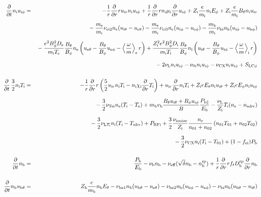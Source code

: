 \documentclass[11pt]{article}
\def\r#1{{\rm#1}}
\def\ddt{\frac{\partial}{\partial t}}
\def\ddr{\frac{\partial}{\partial r}}
\def\ave#1{\left\langle#1\right\rangle}
\def\me{m_\r{e}}
\def\mi{m_\r{i}}
\def\mb{m_\r{b}}
\def\mui{\mu_\r{i}}
\def\De{D_\r{e}}
\def\Di{D_\r{i}}
\def\chii{\chi_\r{i}}
\def\ne{n_\r{e}}
\def\ni{n_\r{i}}
\def\nb{n_\r{b}}
\def\uir{u_{\r{i}r}}
\def\ueth{u_{\r{e}\theta}}
\def\uith{u_{\r{i}\theta}}
\def\ubth{u_{\r{b}\theta}}
\def\ueph{u_{\r{e}\phi}}
\def\uiph{u_{\r{i}\phi}}
\def\ubph{u_{\r{b}\phi}}
\def\Eth{E_\theta}
\def\Eph{E_\phi}
\def\Bth{B_\theta}
\def\Bph{B_\phi}
\def\Te{T_\r{e}}
\def\Ti{T_\r{i}}
\def\nna{n_{01}}
\def\nnb{n_{02}}
\def\Zi{Z_\r{i}}
\def\Zb{Z_\r{b}}
\def\Pb{P_\r{b}}
\def\Eb{E_\r{b}}
\def\PRFi{P_\r{RFi}}
\def\Tna{T_{01}}
\def\Tnb{T_{02}}
\def\fei{f_\r{ei}}
\def\nbrp{n_\r{b}^\r{rp}}
\def\Pbpara{P_{\r{b}\parallel}}
\def\nueff{\nu_\r{eff}}
\def\Dbrp{D_\r{b}^\r{rp}}
\def\nuNCi{\nu_\r{NCi}}
\def\nubi{\nu_\r{bi}}
\def\nuni{\nu_\r{0i}}
\def\nuL{\nu_\r{L}}
\def\nuCX{\nu_\r{CX}}
\def\nuion{\nu_\r{ionize}}
\def\nub{\nu_\r{b}}
\def\nuTei{\nu_\r{Tei}}
\def\vb{v_\r{b}}
\def\nediv{n_\r{ediv}}
\def\Tidiv{T_\r{idiv}}
\def\nuLTi{\nu_{\r{L}T_\r{i}}}
\begin{document}
\begin{eqnarray}
%
%
\\[5mm]
%
%
  \ddt \ni \uiph &=&
%
  - \frac{1}{r} \ddr r \uir \ni \uiph
%
  + \frac{1}{r} \ddr r \ni \mui \ddr \uiph
%
  + \Zi \frac{e}{\mi} \ni \Eph
%
  + \Zi \frac{e}{\mi} \Bth \ni \uir 
\nonumber\\[2.5mm]&&{}
%
  - \frac{\me}{\mi} \nu_\r{ei2} \ne (\uith - \ueth)
%
  - \frac{\me}{\mi} \nu_\r{ei3} \ne (\uiph - \ueph)
%
  - \frac{\mb}{\mi} \nubi \nb (\uiph - \ubph)
\nonumber\\[2.5mm]&&{}
%
  - \frac{e^2 \Bph^2 \De}{\mi\Te}\frac{\Bth}{\Bph}\ne
    \left(\ueth - \frac{\Bth}{\Bph}\ueph - \ave{\frac{\omega}{m}}_\r{e}
     r \right)
%
  + \frac{\Zi^2 e^2 \Bph^2 \Di}{\mi\Ti}\frac{\Bth}{\Bph}\ni
    \left(\uith - \frac{\Bth}{\Bph}\uiph - \ave{\frac{\omega}{m}}_\r{i}
     r \right)
\nonumber\\[2.5mm]&&{}
%
  - 2 \nuL \ni \uiph
%
  - \nuni \ni \uiph
%
  - \nuCX \ni \uiph
%
  + S_\r{LC\phi}
%
%
\\[5mm]
%
%
  \ddt \, \frac{3}{2} \ni \Ti &=&
%
 - \frac{1}{r} \ddr r
   \left( \frac{5}{2} \uir \ni \Ti - \ni \chii \ddr \Ti \right)
%
  + \uir \ddr \ni \Ti
%
  + \Zi e \Eth \ni \uith
%
  + \Zi e \Eph \ni \uiph
\nonumber\\[2.5mm]&&{}
%
  - \frac{3}{2} \nuTei \ne (\Ti - \Te)
%
  + \mb \vb \frac{\Bth \uith + \Bph \uiph}{B} \frac{\Pbpara}{\Eb}
%
  - \frac{\nuL}{\Zi} \Ti (\ne - \nediv)
\nonumber\\[2.5mm]&&{}
%
  - \frac{3}{2} \nuLTi \ni (\Ti - \Tidiv)
%
  + \PRFi
%
  + \frac{3}{2} \frac{\nuion}{\Zi} \frac{\ne}{\nna +\nnb}\, (\nna \Tna +
  \nnb \Tnb)
\nonumber\\[2.5mm]&&{}
%
  - \frac{3}{2} \nuCX \ni (\Ti - \Tna)
%
  + (1 - \fei) \Pb
\\[5mm]
%
%
  \ddt \nb &=&
%
    \frac{\Pb}{\Eb}
%
  - \nub \nb
%
  - \nueff (\sqrt{\delta}\nb - \nbrp)
%
  + \frac{1}{r} \ddr r f_t \Dbrp \ddr \nb
\\[5mm]
%
%
  \ddt \nb \ubth &=&
%
    \Zb \frac{e}{\mb} \nb \Eth
%
%
  - \nu_\r{be1} \nb (\ubth - \ueth)
%
  - \nu_\r{be2} \nb (\ubph - \ueph)
%
  - \nubi \nb (\ubth - \uith)

\end{eqnarray}
\end{document}
